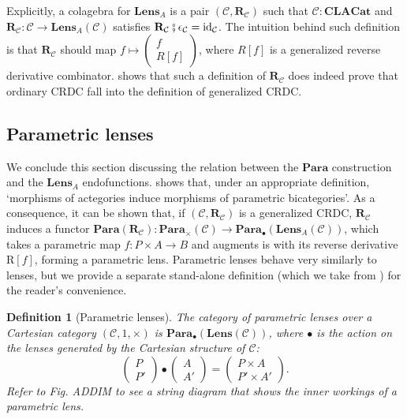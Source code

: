 \documentclass[11pt,a4paper,openright,twoside]{report}
\theoremstyle{plain}
\newtheorem{definition}[proposition]{Definition}
\theoremstyle{definition}
\begin{document}
Explicitly, a colagebra for $\mathbf{Lens}_A$ is a pair $(\mathcal{C}, \mathbf{R}_{\mathcal{C}})$ such that $\mathcal{C}: \mathbf{CLACat}$ and $\mathbf{R}_{\mathcal{C}}: \mathcal{C} \to \mathbf{Lens}_A(\mathcal{C})$ satisfies $\mathbf{R}_{\mathcal{C}} \fatsemi \epsilon_{\mathcal{C}} = \mathrm{id}_{\mathcal{C}}$. The intuition behind such definition is that $\mathbf{R}_{\mathcal{C}}$ should map $f \mapsto \left(\begin{smallmatrix} f \\ R[f] \end{smallmatrix}\right)$, where $R[f]$ is a generalized reverse derivative combinator. \cite{gavranovic2024fundamental} shows that such a definition of $\mathbf{R}_{\mathcal{C}}$ does indeed prove that ordinary CRDC fall into the definition of generalized CRDC. 


\subsection{Parametric lenses}

We conclude this section discussing the relation between the $\mathbf{Para}$ construction and the $\mathbf{Lens}_A$ endofunctions. \cite{gavranovic2024fundamental} shows that, under an appropriate definition, \lq morphisms of actegories induce morphisms of parametric bicategories\rq. As a consequence, it can be shown that, if  $(\mathcal{C}, \mathbf{R}_{\mathcal{C}})$ is a generalized CRDC,  $\mathbf{R}_{\mathcal{C}}$ induces a functor $\mathbf{Para}(\mathbf{R}_{\mathcal{C}}): \mathbf{Para}_{\times}(\mathcal{C}) \to \mathbf{Para}_{\bullet}(\mathbf{Lens}_A(\mathcal{C}))$, which takes a parametric map $f: P \times A \to B$ and augments is with its reverse derivative $\mathrm{R}[f]$, forming a parametric lens. Parametric lenses behave very similarly to lenses, but we provide a separate stand-alone definition (which we take from \cite{cruttwell2022categorical}) for the reader's convenience.

\begin{definition}[Parametric lenses]
  The category of parametric lenses over a Cartesian category $(\mathcal{C},1,\times)$ is $\mathbf{Para}_{\bullet}(\mathbf{Lens}(\mathcal{C}))$, where $\bullet$ is the action on the lenses generated by the Cartesian structure of $\mathcal{C}$:
  \[\begin{pmatrix}
    P \\ P'
  \end{pmatrix} \bullet \begin{pmatrix}
    A \\ A'
  \end{pmatrix} = \begin{pmatrix}
    P \times A \\ P' \times A'
  \end{pmatrix}.\]
  Refer to \textit{Fig. ADDIM} to see a string diagram that shows the inner workings of a parametric lens.
\end{definition}
\end{document}

